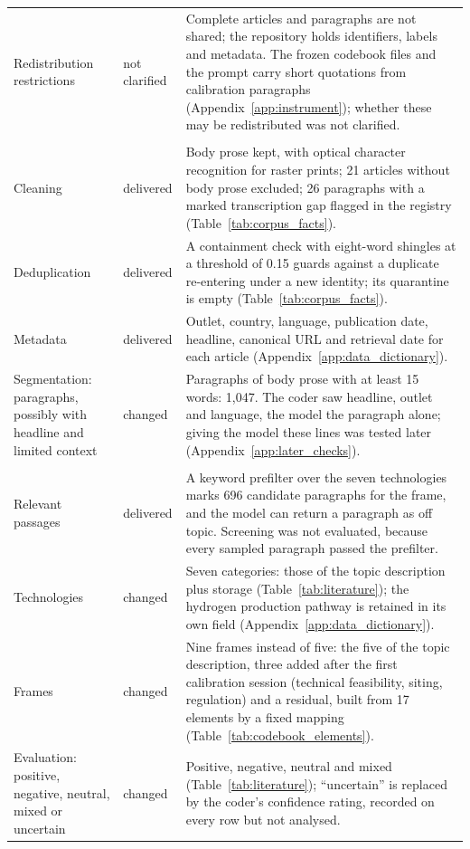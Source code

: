 \begin{longtable}{@{}>{\raggedright\arraybackslash}p{32mm}>{\raggedright\arraybackslash}p{14mm}>{\raggedright\arraybackslash}p{106mm}@{}}
Redistribution restrictions & not clarified & Complete articles and paragraphs are not shared; the repository holds identifiers, labels and metadata. The frozen codebook files and the prompt carry short quotations from calibration paragraphs (Appendix~\ref{app:instrument}); whether these may be redistributed was not clarified. \\
\multicolumn{3}{@{}l}{\emph{Corpus preparation}} \\
Cleaning & delivered & Body prose kept, with optical character recognition for raster prints; 21 articles without body prose excluded; 26 paragraphs with a marked transcription gap flagged in the registry (Table~\ref{tab:corpus_facts}). \\
Deduplication & delivered & A containment check with eight-word shingles at a threshold of 0.15 guards against a duplicate re-entering under a new identity; its quarantine is empty (Table~\ref{tab:corpus_facts}). \\
Metadata & delivered & Outlet, country, language, publication date, headline, canonical URL and retrieval date for each article (Appendix~\ref{app:data_dictionary}). \\
Segmentation: paragraphs, possibly with headline and limited context & changed & Paragraphs of body prose with at least 15 words: 1,047. The coder saw headline, outlet and language, the model the paragraph alone; giving the model these lines was tested later (Appendix~\ref{app:later_checks}). \\
\multicolumn{3}{@{}l}{\emph{Extraction}} \\
Relevant passages & delivered & A keyword prefilter over the seven technologies marks 696 candidate paragraphs for the frame, and the model can return a paragraph as off topic. Screening was not evaluated, because every sampled paragraph passed the prefilter. \\
Technologies & changed & Seven categories: those of the topic description plus storage (Table~\ref{tab:literature}); the hydrogen production pathway is retained in its own field (Appendix~\ref{app:data_dictionary}). \\
Frames & changed & Nine frames instead of five: the five of the topic description, three added after the first calibration session (technical feasibility, siting, regulation) and a residual, built from 17 elements by a fixed mapping (Table~\ref{tab:codebook_elements}). \\
Evaluation: positive, negative, neutral, mixed or uncertain & changed & Positive, negative, neutral and mixed (Table~\ref{tab:literature}); ``uncertain'' is replaced by the coder's confidence rating, recorded on every row but not analysed. \\

\end{longtable}

